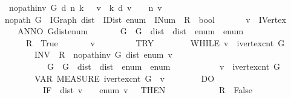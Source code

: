 \begin{isabellebody}
\ \ {\isachardoublequoteopen}no{\isacharunderscore}path{\isacharunderscore}inv\ G\ d\ n\ k\ {\isasymequiv}\ \ {\isasymforall}v\ {\isacharless}\ k{\isachardot}\ {\isacharparenleft}d\ v\ {\isacharequal}\ {\isasyminfinity}\ {\isasymlongleftrightarrow}\ n\ v\ {\isacharequal}\ {\isasyminfinity}{\isacharparenright}{\isachardoublequoteclose}\isanewline
\isanewline
{}\isamarkupfalse%
\ no{\isacharunderscore}path\ {\isacharparenleft}G\ {\isacharcolon}{\isacharcolon}\ IGraph{\isacharcomma}\ dist\ {\isacharcolon}{\isacharcolon}\ IDist{\isacharcomma}\ enum\ {\isacharcolon}{\isacharcolon}\ INum\ {\isacharbar}\ R\ {\isacharcolon}{\isacharcolon}\ bool{\isacharparenright}\isanewline
\ \ \isanewline
\ \ \ \ v\ {\isacharcolon}{\isacharcolon}\ IVertex\isanewline
\ \ \ {\isachardoublequoteopen}\isanewline
\ \ \ \ ANNO\ {\isacharparenleft}G{\isacharcomma}dist{\isacharcomma}enum{\isacharparenright}{\isachardot}\isanewline
\ \ \ \ \ \ {\isasymlbrace}\ {\isasymacute}G\ {\isacharequal}\ G\ {\isasymand}\ {\isasymacute}dist\ {\isacharequal}\ dist\ {\isasymand}\ {\isasymacute}enum\ {\isacharequal}\ enum\ {\isasymrbrace}\isanewline
\ \ \ \ \ \ {\isasymacute}R\ {\isacharcolon}{\isacharequal}{\isacharequal}\ True\ {\isacharsemicolon}{\isacharsemicolon}\isanewline
\ \ \ \ \ \ {\isasymacute}v\ {\isacharcolon}{\isacharequal}{\isacharequal}\ {}\ {\isacharsemicolon}{\isacharsemicolon}\isanewline
\ \ \ \ \ \ TRY\isanewline
\ \ \ \ \ \ \ \ WHILE\ {\isasymacute}v\ {\isacharless}\ ivertex{\isacharunderscore}cnt\ {\isasymacute}G\isanewline
\ \ \ \ \ \ \ \ INV\ {\isasymlbrace}\ {\isasymacute}R\ {\isacharequal}\ no{\isacharunderscore}path{\isacharunderscore}inv\ {\isasymacute}G\ {\isasymacute}dist\ {\isasymacute}enum\ {\isasymacute}v\isanewline
\ \ \ \ \ \ \ \ \ \ {\isasymand}\ {\isasymacute}G\ {\isacharequal}\ G\ {\isasymand}\ {\isasymacute}dist\ {\isacharequal}\ dist\ {\isasymand}\ {\isasymacute}enum\ {\isacharequal}\ enum\isanewline
\ \ \ \ \ \ \ \ \ \ {\isasymand}\ {\isasymacute}v\ {\isasymle}\ ivertex{\isacharunderscore}cnt\ {\isasymacute}G{\isasymrbrace}\isanewline
\ \ \ \ \ \ \ \ VAR\ MEASURE\ {\isacharparenleft}ivertex{\isacharunderscore}cnt\ {\isasymacute}G\ {\isacharminus}\ {\isasymacute}v{\isacharparenright}\isanewline
\ \ \ \ \ \ \ \ DO\isanewline
\ \ \ \ \ \ \ \ \ \ IF\ \ {\isasymnot}{\isacharparenleft}{\isasymacute}dist\ {\isasymacute}v\ {\isacharequal}\ {\isasyminfinity}\ {\isasymlongleftrightarrow}\ {\isasymacute}enum\ {\isasymacute}v\ {\isacharequal}\ {\isasyminfinity}{\isacharparenright}\ THEN\isanewline
\ \ \ \ \ \ \ \ \ \ \ \ {\isasymacute}R\ {\isacharcolon}{\isacharequal}{\isacharequal}\ False\ {\isacharsemicolon}{\isacharsemicolon}\isanewline

\end{isabellebody}
